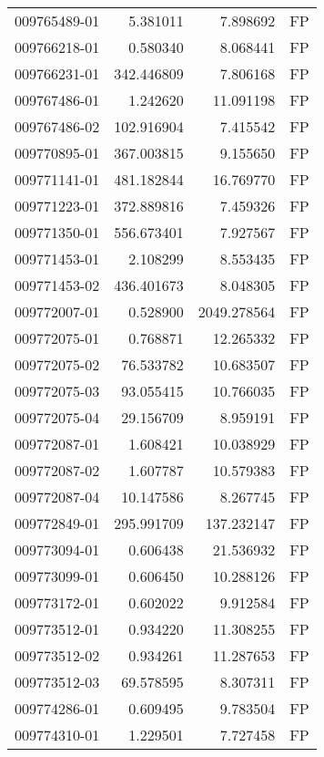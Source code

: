 \begin{tabular}{lrrl}
009765489-01 &    5.381011 &       7.898692 &   FP \\
009766218-01 &    0.580340 &       8.068441 &   FP \\
009766231-01 &  342.446809 &       7.806168 &   FP \\
009767486-01 &    1.242620 &      11.091198 &   FP \\
009767486-02 &  102.916904 &       7.415542 &   FP \\
009770895-01 &  367.003815 &       9.155650 &   FP \\
009771141-01 &  481.182844 &      16.769770 &   FP \\
009771223-01 &  372.889816 &       7.459326 &   FP \\
009771350-01 &  556.673401 &       7.927567 &   FP \\
009771453-01 &    2.108299 &       8.553435 &   FP \\
009771453-02 &  436.401673 &       8.048305 &   FP \\
009772007-01 &    0.528900 &    2049.278564 &   FP \\
009772075-01 &    0.768871 &      12.265332 &   FP \\
009772075-02 &   76.533782 &      10.683507 &   FP \\
009772075-03 &   93.055415 &      10.766035 &   FP \\
009772075-04 &   29.156709 &       8.959191 &   FP \\
009772087-01 &    1.608421 &      10.038929 &   FP \\
009772087-02 &    1.607787 &      10.579383 &   FP \\
009772087-04 &   10.147586 &       8.267745 &   FP \\
009772849-01 &  295.991709 &     137.232147 &   FP \\
009773094-01 &    0.606438 &      21.536932 &   FP \\
009773099-01 &    0.606450 &      10.288126 &   FP \\
009773172-01 &    0.602022 &       9.912584 &   FP \\
009773512-01 &    0.934220 &      11.308255 &   FP \\
009773512-02 &    0.934261 &      11.287653 &   FP \\
009773512-03 &   69.578595 &       8.307311 &   FP \\
009774286-01 &    0.609495 &       9.783504 &   FP \\
009774310-01 &    1.229501 &       7.727458 &   FP \\

\end{tabular}
